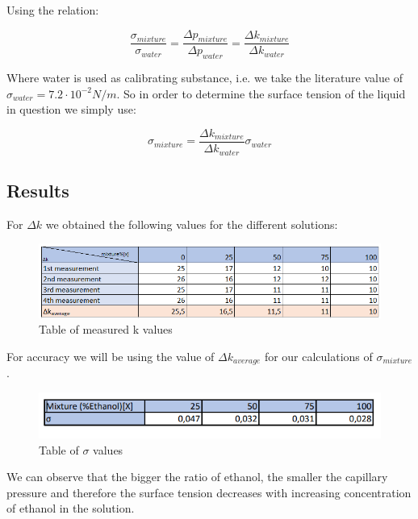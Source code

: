 \documentclass{scrartcl}
\begin{document}
Using the relation:

\centering
\begin{equation}
    \frac{\sigma_{mixture}}{\sigma_{water}}=\frac{\Delta p_{mixture}}{\Delta p_{water}}=\frac{\Delta k_{mixture}}{\Delta k_{water}}\nonumber
\end{equation}
\flushleft
\medskip

 Where water is used as calibrating substance, i.e. we take the literature value of $\sigma_{water}=7.2\cdot10^{-2} N/m$. So in order to determine the surface tension of the liquid in question we simply use:
 
 \centering
 \begin{equation}
     \sigma_{mixture}=\frac{\Delta k_{mixture}}{\Delta k_{water}}\sigma_{water}
 \end{equation}
 \flushleft

\newpage

\subsection{Results}

For $\Delta k$ we obtained the following values for the different solutions:

\begin{figure}[h]
    \centering
    \includegraphics[width=15cm]{TP6_Delta_K_Ring_method.PNG}
    \caption{Table of measured k values}
    \label{fig:5}
\end{figure}

 For accuracy we will be using the value of $\Delta k_{average}$ for our calculations of $\sigma_{mixture}$.

\begin{figure}[h]
    \centering
    \includegraphics[width=15cm]{TP6_Sigma_Ring_Method.PNG}
    \caption{Table of $\sigma$ values}
    \label{fig:6}
\end{figure}

 We can observe that the bigger the ratio of ethanol, the smaller the capillary pressure and therefore the surface tension decreases with increasing concentration of ethanol in the solution.
\end{document}
